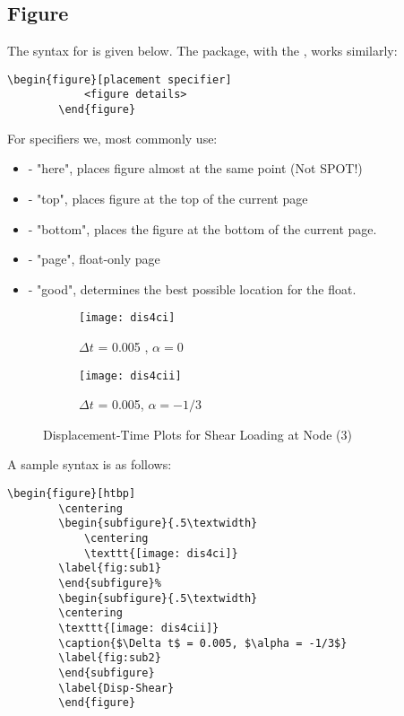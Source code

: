 \subsection{Figure}
The syntax for  is given below. The  package, with the , works similarly: 
\begin{lstlisting}[frame=single]
		\begin{figure}[placement specifier]
			<figure details>
		\end{figure}
\end{lstlisting}
For specifiers we, most commonly use: 
\begin{itemize}
\item {} - "here", places figure almost at the same point (Not SPOT!)
\item {} - "top", places figure at the top of the current page
\item {} - "bottom", places the figure at the bottom of the current page. 
\item {} - "page", float-only page 
\item \tet{!} - "good", determines the best possible location for the float. 
\end{itemize}
\begin{figure}[!]
\centering
\begin{subfigure}{.5\textwidth}
  \centering
  \texttt{[image: dis4ci]}
  \caption{$\Delta t$ = 0.005 , $\alpha = 0$}
  \label{fig:sub1}
\end{subfigure}%
\begin{subfigure}{.5\textwidth}
  \centering
  \texttt{[image: dis4cii]}
  \caption{$\Delta t$ = 0.005, $\alpha = -1/3$}
  \label{fig:sub2}
\end{subfigure}
\caption{ Displacement-Time Plots for Shear Loading at Node (3) }
\label{Disp-Shear}
\end{figure}
A sample syntax is as follows: 
\begin{lstlisting}[frame=single]
		\begin{figure}[htbp]
		\centering
		\begin{subfigure}{.5\textwidth}
  			\centering
  			\texttt{[image: dis4ci]}
  		\label{fig:sub1}
		\end{subfigure}%
		\begin{subfigure}{.5\textwidth}
  		\centering
  		\texttt{[image: dis4cii]}
  		\caption{$\Delta t$ = 0.005, $\alpha = -1/3$}
  		\label{fig:sub2}
		\end{subfigure}
		\label{Disp-Shear}
		\end{figure}
\end{lstlisting}
